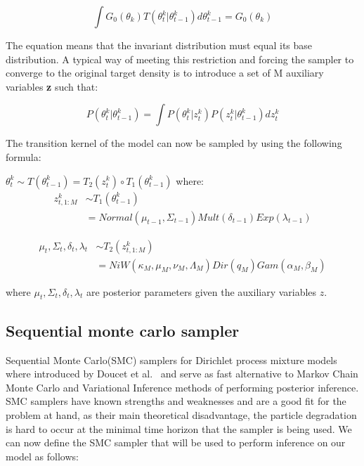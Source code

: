 \documentclass[twoside,hidelinks]{article}
\begin{document}
$$ \int G_0(\theta_k) T(\theta_t^k | \theta_{t-1}^k) d\theta_{t-1}^k =  G_0(\theta_k) $$

The equation means that the invariant distribution must equal its base distribution. A typical way of meeting this restriction and forcing the sampler to converge to the original target density\cite{smc:theory} is to introduce a set of M auxiliary variables \textbf{z} such that:

$$ P(\theta_t^k | \theta_{t-1}^k) =  \int P(\theta_t^k | z_{t}^k)   P(z_t^k| \theta_{t-1}^k) dz_t^k $$

The transition kernel of the model can now be sampled by using the following formula:

$\theta_t^k \sim T(\theta_{t-1}^k) = T_2(z_t^k) \circ T_1(\theta_{t-1}^k)$ where:
\begin{equation} \label{eq1}
\begin{split}
    z_{t,1:M}^k  & \sim T_1(\theta_{t-1}^k)\\
 & = Normal(\mu_{t-1}, \Sigma_{t-1}) Mult( \delta_{t-1}) Exp( \lambda_{t-1})
\end{split}
\end{equation}

\begin{equation}
\begin{split}
    \mu_t, \Sigma_t, \delta_t,  \lambda_t & \sim T_2(z_{t,1:M}^k)\\
 & = NiW( \kappa_M, \mu_M, \nu_M, \Lambda_M ) Dir(q_M) Gam(\alpha_M, \beta_M) 
\end{split}
\end{equation}

where $\mu_t, \Sigma_t, \delta_t,  \lambda_t$  are posterior parameters given the auxiliary variables $z$.

\subsection{Sequential monte carlo sampler}
\label{smcsampler}
Sequential Monte Carlo(SMC) samplers for Dirichlet process mixture models where introduced by Doucet et al.~\cite{doucet} and serve as fast alternative to Markov Chain Monte Carlo and Variational Inference methods of performing posterior inference. SMC samplers have known strengths and weaknesses and are a good fit for the problem at hand, as their main theoretical disadvantage, the particle degradation is hard to occur at the minimal time horizon that the sampler is being used. We can now define the SMC sampler that will be used to perform inference on our model as follows:
\end{document}
